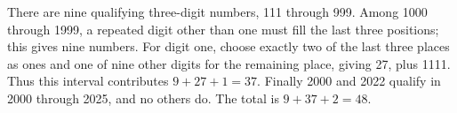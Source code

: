There are nine qualifying three-digit numbers, 111 through 999. Among 1000 through 1999, a repeated digit other than one must fill the last three positions; this gives nine numbers. For digit one, choose exactly two of the last three places as ones and one of nine other digits for the remaining place, giving 27, plus 1111. Thus this interval contributes $9+27+1=37$. Finally 2000 and 2022 qualify in 2000 through 2025, and no others do. The total is $9+37+2=\boxed{48}$.
